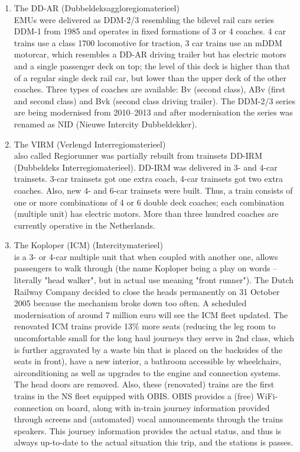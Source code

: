 \begin{appendices}
\begin{enumerate}
    \item The DD-AR (Dubbeldeksaggloregiomaterieel) \\  EMUs were delivered as DDM-2/3 resembling the bilevel rail cars series DDM-1 from 1985 and operates in fixed formations of 3 or 4 coaches. 4 car trains use a class 1700 locomotive for traction, 3 car trains use an mDDM motorcar, which resembles a DD-AR driving trailer but has electric motors and a single passenger deck on top; the level of this deck is higher than that of a regular single deck rail car, but lower than the upper deck of the other coaches. Three types of coaches are available: Bv (second class), ABv (first and second class) and Bvk (second class driving trailer). The DDM-2/3 series are being modernised from 2010–2013 and after modernisation the series was renamed as NID (Nieuwe Intercity Dubbeldekker).
    \item The VIRM (Verlengd Interregiomaterieel) \\ also called Regiorunner was partially rebuilt from trainsets DD-IRM (Dubbeldeks Interregiomaterieel). DD-IRM was delivered in 3- and 4-car trainsets. 3-car trainsets got one extra coach, 4-car trainsets got two extra coaches. Also, new 4- and 6-car trainsets were built. Thus, a train consists of one or more combinations of 4 or 6 double deck coaches; each combination (multiple unit) has electric motors. More than three hundred coaches are currently operative in the Netherlands.
    \item The Koploper (ICM) (Intercitymaterieel) \\ is a 3- or 4-car multiple unit that when coupled with another one, allows passengers to walk through (the name Koploper being a play on words – literally "head walker", but in actual use meaning "front runner"). The Dutch Railway Company decided to close the heads permanently on 31 October 2005 because the mechanism broke down too often. A scheduled modernisation of around 7 million euro will see the ICM fleet updated. The renovated ICM trains provide 13\% more seats (reducing the leg room to uncomfortable small for the long haul journeys they serve in 2nd class, which is further aggravated by a waste bin that is placed on the backsides of the seats in front), have a new interior, a bathroom accessible by wheelchairs, airconditioning as well as upgrades to the engine and connection systems. The head doors are removed. Also, these (renovated) trains are the first trains in the NS fleet equipped with OBIS. OBIS provides a (free) WiFi-connection on board, along with in-train journey information provided through screens and (automated) vocal announcements through the trains speakers. This journey information provides the actual status, and thus is always up-to-date to the actual situation this trip, and the stations is passes.

\end{enumerate}
\end{appendices}
